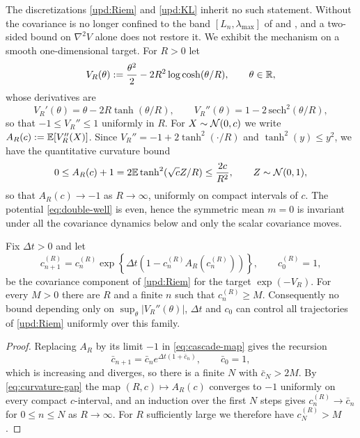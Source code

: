 The discretizations \eqref{upd:Riem} and \eqref{upd:KL} inherit no such statement. Without  the covariance is no longer confined to the band $[L_n, \lambda_{\max}]$ of  and , and a two-sided bound on $\nabla^2 V$ alone does not restore it. We exhibit the mechanism on a smooth one-dimensional target. For $R > 0$ let
\begin{equation}\label{eq:double-well}
    V_R (\theta) := \frac{\theta^2}{2} - 2R^2 \log \cosh (\theta / R), \qquad \theta \in \mathbb{R},
\end{equation}
whose derivatives are
\begin{equation*}
    V_R' (\theta) = \theta - 2R \tanh (\theta/R), \qquad V_R'' (\theta) = 1 - 2\,\mathrm{sech}^2 (\theta/R),
\end{equation*}
so that $-1 \leq V_R'' \leq 1$ uniformly in $R$. For $X \sim \mathcal{N} (0, c)$ we write $A_R (c) := \mathbb{E} [V_R'' (X)]$. Since $V_R'' = -1 + 2 \tanh^2 (\cdot / R)$ and $\tanh^2 (y) \leq y^2$, we have the quantitative curvature bound
\begin{equation}\label{eq:curvature-gap}
    0 \leq A_R (c) + 1 = 2 \mathbb{E} \tanh^2 (\sqrt{c} Z / R) \leq \frac{2c}{R^2}, \qquad Z \sim \mathcal{N} (0,1),
\end{equation}
so that $A_R (c) \to -1$ as $R \to \infty$, uniformly on compact intervals of $c$. The potential \eqref{eq:double-well} is even, hence the symmetric mean $m = 0$ is invariant under all the covariance dynamics below and only the scalar covariance moves.

\begin{proposition}\label{prop:cascade-Riem}
    Fix $\Delta t > 0$ and let
    \begin{equation}\label{eq:cascade-map}
        c_{n+1}^{(R)} = c_n^{(R)} \exp \left\{ \Delta t \left( 1 - c_n^{(R)} A_R (c_n^{(R)}) \right) \right\}, \qquad c_0^{(R)} = 1,
    \end{equation}
    be the covariance component of \eqref{upd:Riem} for the target $\exp (-V_R)$. For every $M > 0$ there are $R$ and a finite $n$ such that $c_n^{(R)} \geq M$. Consequently no bound depending only on $\sup_\theta |V_R'' (\theta)|$, $\Delta t$ and $c_0$ can control all trajectories of \eqref{upd:Riem} uniformly over this family.
\end{proposition}

\begin{proof}
    Replacing $A_R$ by its limit $-1$ in \eqref{eq:cascade-map} gives the recursion
    \begin{equation*}
        \bar c_{n+1} = \bar c_n e^{\Delta t (1 + \bar c_n)}, \qquad \bar c_0 = 1,
    \end{equation*}
    which is increasing and diverges, so there is a finite $N$ with $\bar c_N > 2M$. By \eqref{eq:curvature-gap} the map $(R, c) \mapsto A_R (c)$ converges to $-1$ uniformly on every compact $c$-interval, and an induction over the first $N$ steps gives $c_n^{(R)} \to \bar c_n$ for $0 \leq n \leq N$ as $R \to \infty$. For $R$ sufficiently large we therefore have $c_N^{(R)} > M$.
\end{proof}

